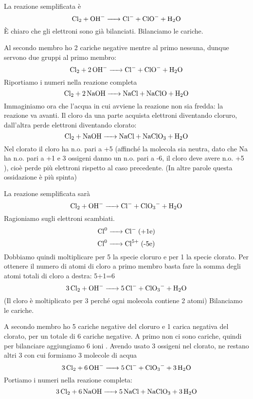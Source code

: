 La reazione semplificata è
$$\ce{Cl_2 + OH- -> Cl- + ClO- + H_2O}$$
È chiaro che gli elettroni sono già bilanciati. Bilanciamo le cariche.

Al secondo membro ho 2 cariche negative mentre al primo nessuna, dunque servono due gruppi  al primo membro:
$$\ce{Cl_2 + 2OH- -> Cl- + ClO- + H_2O}$$
Riportiamo i numeri nella reazione completa
$$\ce{Cl_2 + 2NaOH -> NaCl + NaClO + H_2O}$$
Immaginiamo ora che l'acqua in cui avviene la reazione non sia fredda: la reazione va avanti. Il cloro da una parte acquista elettroni diventando cloruro, dall'altra perde elettroni diventando clorato:
$$\ce{Cl_2 + NaOH -> NaCl + NaClO_3 + H_2O}$$
Nel clorato il cloro ha n.o. pari a +5 (affinché la molecola  sia neutra, dato che Na ha n.o. pari a +1 e 3 ossigeni danno un n.o. pari a -6, il cloro deve avere n.o. +5 ), cioè perde più elettroni rispetto al caso precedente. (In altre parole questa ossidazione è più spinta)

La reazione semplificata sarà
$$\ce{Cl_2 + OH- -> Cl- + ClO_3- + H_2O}$$
Ragioniamo sugli elettroni scambiati.
$$\ce{Cl^0 ->Cl-} \; \text{(+1e)}$$
$$\ce{Cl^0 ->Cl^5+} \; \text{(-5e)}$$
Dobbiamo quindi moltiplicare per 5 la specie cloruro e per 1 la specie clorato. Per ottenere il numero di atomi di cloro a primo membro basta fare la somma degli atomi totali di cloro a destra: 5+1=6
$$\ce{3Cl_2 + OH- -> 5Cl- + ClO_3- + H_2O}$$
(Il cloro è moltiplicato per 3 perché ogni molecola contiene 2 atomi)
Bilanciamo le cariche.

A secondo membro ho 5 cariche negative del cloruro e 1 carica negativa del clorato, per un totale di 6 cariche negative. A primo non ci sono cariche, quindi per bilanciare aggiungiamo 6 ioni . Avendo usato 3 ossigeni nel clorato, ne restano altri 3 con cui formiamo 3 molecole di acqua
$$\ce{3Cl_2 + 6OH- -> 5Cl- + ClO_3- + 3H_2O}$$
Portiamo i numeri nella reazione completa:
$$\ce{3Cl_2 + 6NaOH -> 5NaCl + NaClO_3 + 3H_2O}$$
